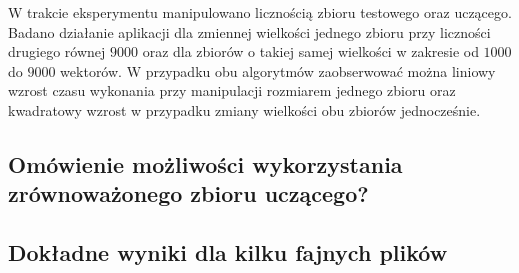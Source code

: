 W trakcie eksperymentu manipulowano licznością zbioru testowego oraz uczącego. Badano działanie aplikacji dla zmiennej wielkości jednego zbioru przy liczności drugiego równej $9000$ oraz dla zbiorów o takiej samej wielkości w zakresie od $1000$ do $9000$ wektorów. W przypadku obu algorytmów zaobserwować można liniowy wzrost czasu wykonania przy manipulacji rozmiarem jednego zbioru oraz kwadratowy wzrost w przypadku zmiany wielkości obu zbiorów jednocześnie.

\subsection{Omówienie możliwości wykorzystania zrównoważonego zbioru uczącego?}

\subsection{Dokładne wyniki dla kilku fajnych plików}



